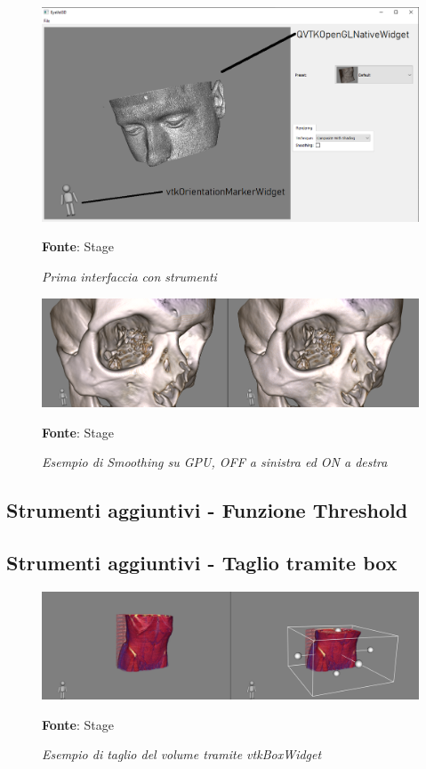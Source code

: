 \begin{figure}[h]
    \centering
    \includegraphics[width=1\textwidth]{immagini/svolgimento/basicwidget.png}
    \caption{\textit{Prima interfaccia con strumenti}}
    \textbf{Fonte}: Stage
    \label{fig: basicwidget}
\end{figure}

\begin{figure}[h]
    \centering
    \includegraphics[width=1\textwidth]{immagini/svolgimento/smoothing.png}
    \caption{\textit{Esempio di Smoothing su GPU, OFF a sinistra ed ON a destra}}
    \textbf{Fonte}: Stage
    \label{fig: firstvolume}
\end{figure}

\subsection{Strumenti aggiuntivi - Funzione Threshold}

\subsection{Strumenti aggiuntivi - Taglio tramite box}
\begin{figure}[h]
    \centering
    \includegraphics[width=1\textwidth]{immagini/svolgimento/boxcrop.png}
    \caption{\textit{Esempio di taglio del volume tramite vtkBoxWidget}}
    \textbf{Fonte}: Stage
    \label{fig: Taglio Box}
\end{figure}

